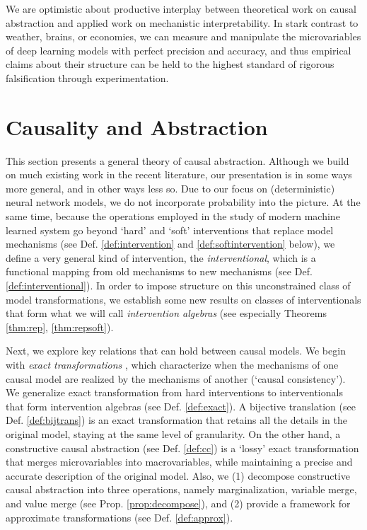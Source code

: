 \documentclass[twoside,11pt]{article}
\begin{document}
We are optimistic about productive interplay between theoretical work on causal abstraction and applied work on mechanistic interpretability. In stark contrast to weather, brains, or economies, we can measure and manipulate the microvariables of deep learning models with perfect precision and accuracy, and thus empirical claims about their structure can be held to the highest standard of rigorous falsification through experimentation.

\newpage

\section{Causality and Abstraction} \label{section:causalmodels}
This section presents a general theory of causal abstraction. Although we build on much existing work in the recent literature, our presentation is in some ways more general, and in other ways less so. Due to our focus on (deterministic) neural network models, we do not incorporate probability into the picture. At the same time, because the operations employed in the study of modern machine learned system go beyond `hard' and `soft' interventions that replace model mechanisms (see Def. \ref{def:intervention} and \ref{def:softintervention} below), we define a very general kind of intervention, the \textit{interventional}, which is a functional mapping from old mechanisms to new mechanisms (see Def. \ref{def:interventional}). In order to impose structure on this unconstrained class of model transformations, we establish some new results on classes of interventionals that form what we will call \emph{intervention algebras} (see especially Theorems \ref{thm:rep}, \ref{thm:repsoft}). 

Next, we explore key relations that can hold between causal models. 
We begin with \textit{exact transformations} \citep{Rubinstein2017}, which characterize when the mechanisms of one causal model are realized by the mechanisms of another (`causal consistency'). We generalize exact transformation from hard interventions to interventionals that form intervention algebras (see Def. \ref{def:exact}). A bijective translation (see Def. \ref{def:bijtrans}) is an exact transformation that retains all the details in the original model, staying at the same level of granularity. On the other hand, a constructive causal abstraction (see Def. \ref{def:cc}) is a `lossy' exact transformation that merges microvariables into macrovariables, while maintaining a precise and accurate description of the original model. Also, we (1) decompose constructive causal abstraction into three operations, namely marginalization, variable merge, and value merge (see Prop. \ref{prop:decompose}), %
and (2) provide a framework for approximate transformations (see Def. \ref{def:approx}). 
\end{document}
